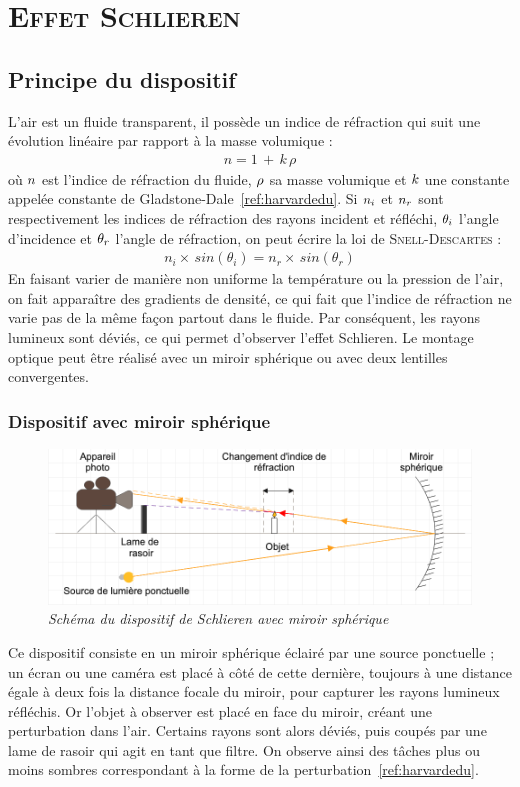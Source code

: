 \renewcommand{\chaptername}{\scshape Partie}
\chapter{\normalfont \scshape Effet Schlieren}
\section{Principe du dispositif}
L'air est un fluide transparent, il possède un indice de réfraction qui suit une évolution linéaire par rapport à la masse volumique :
\begin{align}
	n = 1\,+\,k\,\rho
\end{align}
où $\mathnormal{n}$ est l'indice de réfraction du fluide, $\mathnormal{\rho}$ sa masse volumique et $\mathnormal{k}$ une constante appelée constante de Gladstone-Dale~\ref{ref:harvardedu}. Si $\mathnormal{n_i}$ et $\mathnormal{n_r}$ sont respectivement les indices de réfraction des rayons incident et réfléchi, $\mathnormal{\theta_i}$ l'angle d'incidence et $\mathnormal{\theta_r}$ l'angle de réfraction, on peut écrire la loi de \textsc{Snell-Descartes} :
\begin{align}
	n_i\times\,sin(\theta_i) = n_r\times\,sin(\theta_r) 
\end{align}
En faisant varier de manière non uniforme la température ou la pression de l'air, on fait apparaître des gradients de densité, ce qui fait que l'indice de réfraction ne varie pas de la même façon partout dans le fluide. Par conséquent, les rayons lumineux sont déviés, ce qui permet d'observer l'effet Schlieren. Le montage optique peut être réalisé avec un miroir sphérique ou avec deux lentilles convergentes.
\subsection{Dispositif avec miroir sphérique}
\begin{figure}[H]
	\centering
	\includegraphics[scale = 0.4]{figures/schlieren_miroir.png}
	\caption{\small{\textit{Schéma du dispositif de Schlieren avec miroir sphérique}}}
	\label{fig:schlieren_miroir}
\end{figure}
Ce dispositif consiste en un miroir sphérique éclairé par une source ponctuelle ; un écran ou une caméra est placé à côté de cette dernière, toujours à une distance égale à deux fois la distance focale du miroir, pour capturer les rayons lumineux réfléchis. Or l’objet à observer est placé en face du miroir, créant une perturbation dans l’air. Certains rayons sont alors déviés, puis coupés par une lame de rasoir qui agit en tant que filtre. On observe ainsi des tâches plus ou moins sombres correspondant à la forme de la perturbation~\ref{ref:harvardedu}.
